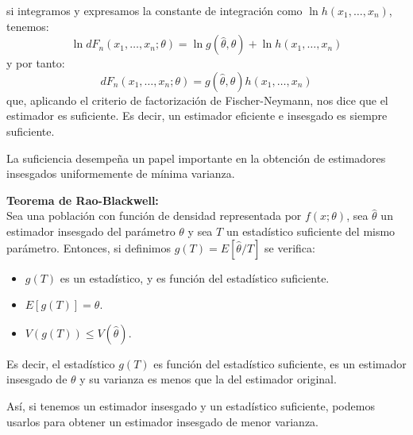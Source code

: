 si integramos y expresamos la constante de integraci\'on como $\ln{h(x_1,\ldots,x_n)}$, tenemos:
\begin{equation*}
\ln{dF_n(x_1,\ldots,x_n;\theta)}=\ln{g(\hat{\theta},\theta)}+\ln{h(x_1,\ldots,x_n)}
\end{equation*}
y por tanto:
\begin{equation*}
dF_n(x_1,\ldots,x_n;\theta)=g(\hat{\theta},\theta)h(x_1,\ldots,x_n)
\end{equation*}
que, aplicando el criterio de factorizaci\'on de Fischer-Neymann, nos dice que el estimador es suficiente. Es decir, un estimador eficiente e insesgado es siempre suficiente.


La suficiencia desempe\~na un papel importante en la obtenci\'on de estimadores insesgados uniformemente de m\'inima varianza.

\begin{teorema}
\textbf{Teorema de Rao-Blackwell:}\\
Sea una poblaci\'on con funci\'on de densidad representada por $f(x;\theta)$, sea $\hat{\theta}$ un estimador insesgado del par\'ametro $\theta$ y sea $T$ un estad\'istico suficiente del mismo par\'ametro. Entonces, si definimos $g(T)=E[\hat{\theta}/T]$ se verifica:
\begin{itemize}
\item $g(T)$ es un estad\'istico, y es funci\'on del estad\'istico suficiente.
\item $E[g(T)]=\theta$.
\item $V(g(T))\leq V(\hat{\theta})$.
\end{itemize}
Es decir, el estad\'istico $g(T)$ es funci\'on del estad\'istico suficiente, es un estimador insesgado de $\theta$ y su varianza es menos que la del estimador original.
\end{teorema}

As\'i, si tenemos un estimador insesgado y un estad\'istico suficiente, podemos usarlos para obtener un estimador insesgado de menor varianza.
